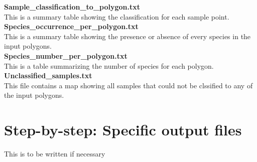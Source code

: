 \documentclass[a4paper,titlepage,11pt]{scrreprt}
\begin{document}
\textbf{Sample\_classification\_to\_polygon.txt}\\
This is a summary table showing the classification for each sample point.\\
\textbf{Species\_occurrence\_per\_polygon.txt}\\
This is a summary table showing the presence or absence of every species in the input polygons.\\
\textbf{Species\_number\_per\_polygon.txt}\\
This is a table summarizing the number of species for each polygon.\\
\textbf{Unclassified\_samples.txt}\\
This file contains a map showing all samples that could not be clssified to any of the input polygons.\\

\chapter{Step-by-step: Specific output files}
This is to be written if necessary
\end{document}
